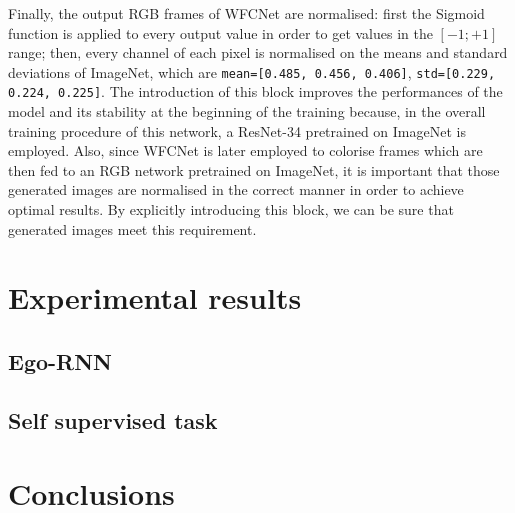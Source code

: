 \documentclass[10pt,twocolumn,letterpaper]{article}
\begin{document}
Finally, the output RGB frames of WFCNet are normalised: first the Sigmoid function is applied to every output value in order to get values in the $[-1; +1]$ range; then, every channel of each pixel is normalised on the means and standard deviations of ImageNet, which are \texttt{mean=[0.485, 0.456, 0.406]}, \texttt{std=[0.229, 0.224, 0.225]}. The introduction of this block improves the performances of the model and its stability at the beginning of the training because, in the overall training procedure of this network, a ResNet-34 pretrained on ImageNet is employed. Also, since WFCNet is later employed to colorise frames which are then fed to an RGB network pretrained on ImageNet, it is important that those generated images are normalised in the correct manner in order to achieve optimal results. By explicitly introducing this block, we can be sure that generated images meet this requirement.

\section{Experimental results}

\subsection{Ego-RNN}

\subsection{Self supervised task}

\section{Conclusions}

{\small


}
\end{document}

